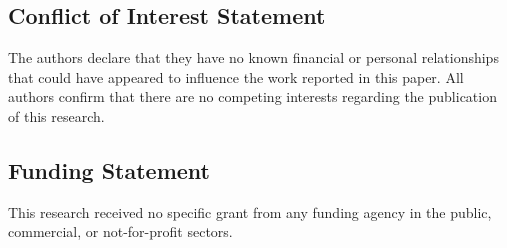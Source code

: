 \documentclass{article}
\begin{document}
\subsection*{Conflict of Interest Statement}
The authors declare that they have no known financial or personal relationships that could have appeared to influence the work reported in this paper. All authors confirm that there are no competing interests regarding the publication of this research.

\subsection*{Funding Statement}
This research received no specific grant from any funding agency in the public, commercial, or not-for-profit sectors.

\end{document}
